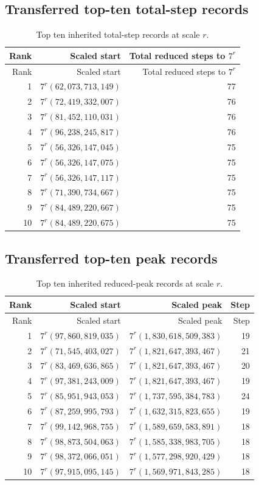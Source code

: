 \documentclass[11pt]{article}
\begin{document}
\subsection{Transferred top-ten total-step records}
\begin{longtable}{@{}r r r@{}}
\caption{Top ten inherited total-step records at scale $r$.}\label{tab:top10steps}\\
\toprule
Rank & Scaled start & Total reduced steps to $7^r$ \\
\midrule
\endfirsthead
\toprule
Rank & Scaled start & Total reduced steps to $7^r$ \\
\midrule
\endhead
1 & $7^r(62,073,713,149)$ & 77 \\
2 & $7^r(72,419,332,007)$ & 76 \\
3 & $7^r(81,452,110,031)$ & 76 \\
4 & $7^r(96,238,245,817)$ & 76 \\
5 & $7^r(56,326,147,045)$ & 75 \\
6 & $7^r(56,326,147,075)$ & 75 \\
7 & $7^r(56,326,147,117)$ & 75 \\
8 & $7^r(71,390,734,667)$ & 75 \\
9 & $7^r(84,489,220,667)$ & 75 \\
10 & $7^r(84,489,220,675)$ & 75 \\
\bottomrule
\end{longtable}

\subsection{Transferred top-ten peak records}
\begin{longtable}{@{}r r r r@{}}
\caption{Top ten inherited reduced-peak records at scale $r$.}\label{tab:top10peaks}\\
\toprule
Rank & Scaled start & Scaled peak & Step \\
\midrule
\endfirsthead
\toprule
Rank & Scaled start & Scaled peak & Step \\
\midrule
\endhead
1 & $7^r(97,860,819,035)$ & $7^r(1,830,618,509,383)$ & 19 \\
2 & $7^r(71,545,403,027)$ & $7^r(1,821,647,393,467)$ & 21 \\
3 & $7^r(83,469,636,865)$ & $7^r(1,821,647,393,467)$ & 20 \\
4 & $7^r(97,381,243,009)$ & $7^r(1,821,647,393,467)$ & 19 \\
5 & $7^r(85,951,943,053)$ & $7^r(1,737,595,384,783)$ & 24 \\
6 & $7^r(87,259,995,793)$ & $7^r(1,632,315,823,655)$ & 19 \\
7 & $7^r(99,142,968,755)$ & $7^r(1,589,659,583,891)$ & 18 \\
8 & $7^r(98,873,504,063)$ & $7^r(1,585,338,983,705)$ & 18 \\
9 & $7^r(98,372,066,051)$ & $7^r(1,577,298,920,429)$ & 18 \\
10 & $7^r(97,915,095,145)$ & $7^r(1,569,971,843,285)$ & 18 \\
\bottomrule
\end{longtable}
\end{document}
